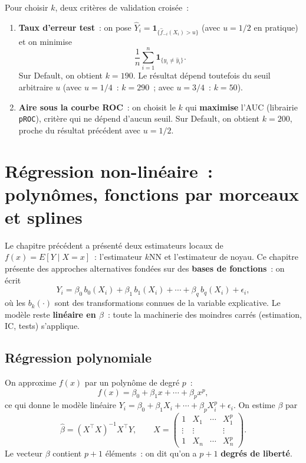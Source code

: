 \documentclass[11pt,letterpaper]{article}
\begin{document}
Pour choisir $k$, deux critères de validation croisée~:
\begin{enumerate}
\item \textbf{Taux d'erreur test}~: on pose $\hat Y_i = \mathbf{1}_{\{\hat f_{-i}(X_i) > u\}}$ (avec $u = 1/2$ en pratique) et on minimise
$$\frac{1}{n}\sum_{i=1}^n\mathbf{1}_{\{y_i\neq\hat y_i\}}.$$
Sur \textsf{Default}, on obtient $k = 190$. Le résultat dépend toutefois du seuil arbitraire $u$ (avec $u = 1/4$~: $k = 290$~; avec $u = 3/4$~: $k = 50$).
\item \textbf{Aire sous la courbe ROC}~: on choisit le $k$ qui \textbf{maximise} l'AUC (librairie \texttt{pROC}), critère qui ne dépend d'aucun seuil. Sur \textsf{Default}, on obtient $k = 200$, proche du résultat précédent avec $u = 1/2$.
\end{enumerate}

\newpage
\section{Régression non-linéaire~: polynômes, fonctions par morceaux et splines}
\label{sec:splines}

Le chapitre précédent a présenté deux estimateurs locaux de $f(x) = E[Y\mid X=x]$~: l'estimateur $k$NN et l'estimateur de noyau. Ce chapitre présente des approches alternatives fondées sur des \textbf{bases de fonctions}~: on écrit
$$Y_i = \beta_0\, b_0(X_i) + \beta_1\, b_1(X_i) + \cdots + \beta_q\, b_q(X_i) + \epsilon_i,$$
où les $b_k(\cdot)$ sont des transformations connues de la variable explicative. Le modèle reste \textbf{linéaire en $\beta$}~: toute la machinerie des moindres carrés (estimation, IC, tests) s'applique.

\subsection{Régression polynomiale}

On approxime $f(x)$ par un polynôme de degré $p$~:
$$f(x) = \beta_0 + \beta_1 x + \cdots + \beta_p x^p,$$
ce qui donne le modèle linéaire $Y_i = \beta_0 + \beta_1 X_i + \cdots + \beta_p X_i^p + \epsilon_i$. On estime $\beta$ par
$$\hat\beta = (X^\top X)^{-1}X^\top Y, \qquad
X = \begin{pmatrix} 1 & X_1 & \cdots & X_1^p\\ \vdots & \vdots & & \vdots\\ 1 & X_n & \cdots & X_n^p \end{pmatrix}.$$
Le vecteur $\beta$ contient $p+1$ éléments~: on dit qu'on a $p+1$ \textbf{degrés de liberté}.
\end{document}
